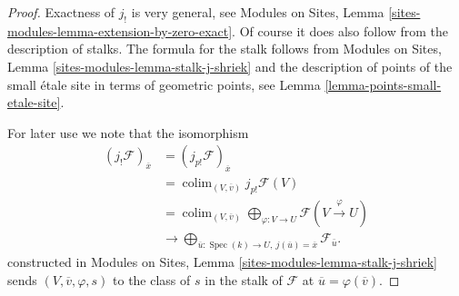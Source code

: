 \documentclass[10pt,a4paper]{amsart}
\theoremstyle{plain}
\theoremstyle{definition}
\theoremstyle{remark}
\numberwithin{equation}{subsection}
\def\colim{\mathop{\mathrm{colim}}\nolimits}
\def\Spec{\mathop{\mathrm{Spec}}}
\begin{document}
\begin{proof}
Exactness of $j_!$ is very general, see Modules on Sites, 
Lemma \ref{sites-modules-lemma-extension-by-zero-exact}.
Of course it does also follow from the description of stalks.
The formula for the stalk follows from
Modules on Sites, Lemma \ref{sites-modules-lemma-stalk-j-shriek}
and the description of points of the small \'etale site
in terms of geometric points, see Lemma \ref{lemma-points-small-etale-site}.

\medskip\noindent
For later use we note that the isomorphism
\begin{align*}
(j_!\mathcal{F})_{\overline{x}}
& =
(j_{p!}\mathcal{F})_{\overline{x}} \\
& =
\colim_{(V, \overline{v})} j_{p!}\mathcal{F}(V) \\
& =
\colim_{(V, \overline{v})}
\bigoplus\nolimits_{\varphi : V \to U}
\mathcal{F}(V \xrightarrow{\varphi} U) \\
& \to
\bigoplus\nolimits_{\overline{u} : \Spec(k) \to U,\ j(\overline{u}) =
\overline{x}} \mathcal{F}_{\bar{u}}.
\end{align*}
constructed in Modules on Sites, Lemma \ref{sites-modules-lemma-stalk-j-shriek}
sends $(V, \overline{v}, \varphi, s)$ to the class of $s$ in the stalk
of $\mathcal{F}$ at $\overline{u} = \varphi(\overline{v})$.
\end{proof}
\end{document}
